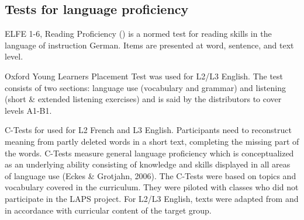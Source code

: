 \documentclass[output=paper]{langsci/langscibook}
\begin{document}
\subsection{Tests for language proficiency}
ELFE 1-6, Reading Proficiency (\citealt{LenhardSchneider2006}) is a normed test for reading skills in the language of instruction German. Items are presented at word, sentence, and text level.

Oxford Young Learners Placement Test \citep{Testing2013} was used for L2/L3 English. The test consists of two sections: language use (vocabulary and grammar) and listening (short \& extended listening exercises) and is said by the distributors to cover levels A1-B1.

C-Tests for used for L2 French and L3 English. Participants need to reconstruct meaning from partly deleted words in a short text, completing the missing part of the words. C-Tests measure general language proficiency which is conceptualized as an underlying ability consisting of knowledge and skills displayed in all areas of language use (Eckes \& Grotjahn, 2006). The C-Tests were based on topics and vocabulary covered in the curriculum. They were piloted with classes who did not participate in the LAPS project. For L2/L3 English, texts were adapted from \citet{BabaiiShahri2010} and \citet{WildenPorsch2017} in accordance with curricular content of the target group.
\end{document}
